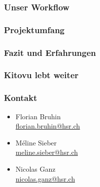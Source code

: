 \documentclass{beamer}
\begin{document}
  \begin{frame}
    \frametitle{Unser Workflow}
  \end{frame}

  \begin{frame}
    \frametitle{Projektumfang}
  \end{frame}

  \begin{frame}
    \frametitle{Fazit und Erfahrungen}
  \end{frame}

  \begin{frame}
    \frametitle{Kitovu lebt weiter}
  \end{frame}

  \begin{frame}
    \frametitle{Kontakt}
    \begin{itemize}
      \item Florian Bruhin \\ \url{florian.bruhin@hsr.ch} \\[2em]
      \item Méline Sieber \\ \url{meline.sieber@hsr.ch} \\[2em]
	    \item Nicolas Ganz \\ \url{nicolas.ganz@hsr.ch} 
    \end{itemize}
  \end{frame}
  
\end{document}
